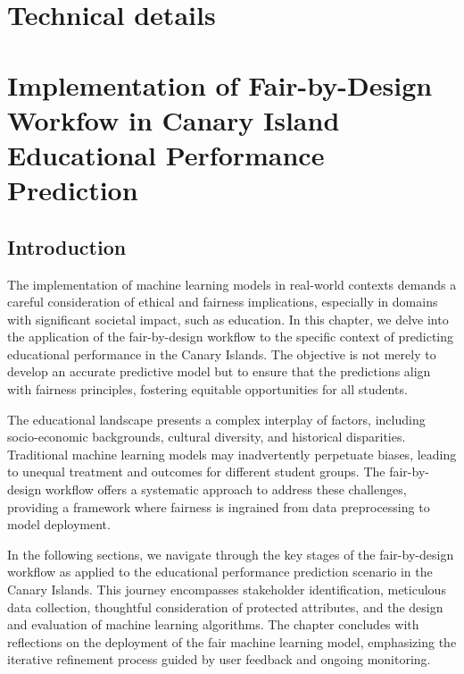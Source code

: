\documentclass[12pt,a4paper,openright,twoside]{book}
\begin{document}
\chapter{Technical details}
\label{chap:technicals}

\chapter{Implementation of Fair-by-Design Workfow in Canary Island Educational Performance Prediction}
\label{chap:real-world-scenario}

\section{Introduction}

The implementation of machine learning models in real-world contexts demands a careful consideration of ethical and fairness implications, especially in domains with significant societal impact, such as education. In this chapter, we delve into the application of the fair-by-design workflow to the specific context of predicting educational performance in the Canary Islands. The objective is not merely to develop an accurate predictive model but to ensure that the predictions align with fairness principles, fostering equitable opportunities for all students.

The educational landscape presents a complex interplay of factors, including socio-economic backgrounds, cultural diversity, and historical disparities. Traditional machine learning models may inadvertently perpetuate biases, leading to unequal treatment and outcomes for different student groups. The fair-by-design workflow offers a systematic approach to address these challenges, providing a framework where fairness is ingrained from data preprocessing to model deployment.

In the following sections, we navigate through the key stages of the fair-by-design workflow as applied to the educational performance prediction scenario in the Canary Islands. This journey encompasses stakeholder identification, meticulous data collection, thoughtful consideration of protected attributes, and the design and evaluation of machine learning algorithms. The chapter concludes with reflections on the deployment of the fair machine learning model, emphasizing the iterative refinement process guided by user feedback and ongoing monitoring.
\end{document}

